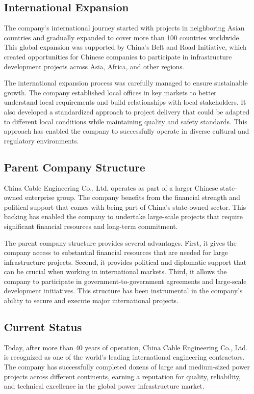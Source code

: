 \subsection{International Expansion}
The company's international journey started with projects in neighboring Asian countries and gradually expanded to cover more than 100 countries worldwide. This global expansion was supported by China's Belt and Road Initiative, which created opportunities for Chinese companies to participate in infrastructure development projects across Asia, Africa, and other regions.

The international expansion process was carefully managed to ensure sustainable growth. The company established local offices in key markets to better understand local requirements and build relationships with local stakeholders. It also developed a standardized approach to project delivery that could be adapted to different local conditions while maintaining quality and safety standards. This approach has enabled the company to successfully operate in diverse cultural and regulatory environments.

\subsection{Parent Company Structure}
China Cable Engineering Co., Ltd. operates as part of a larger Chinese state-owned enterprise group. The company benefits from the financial strength and political support that comes with being part of China's state-owned sector. This backing has enabled the company to undertake large-scale projects that require significant financial resources and long-term commitment.

The parent company structure provides several advantages. First, it gives the company access to substantial financial resources that are needed for large infrastructure projects. Second, it provides political and diplomatic support that can be crucial when working in international markets. Third, it allows the company to participate in government-to-government agreements and large-scale development initiatives. This structure has been instrumental in the company's ability to secure and execute major international projects.

\subsection{Current Status}
Today, after more than 40 years of operation, China Cable Engineering Co., Ltd. is recognized as one of the world's leading international engineering contractors. The company has successfully completed dozens of large and medium-sized power projects across different continents, earning a reputation for quality, reliability, and technical excellence in the global power infrastructure market.

